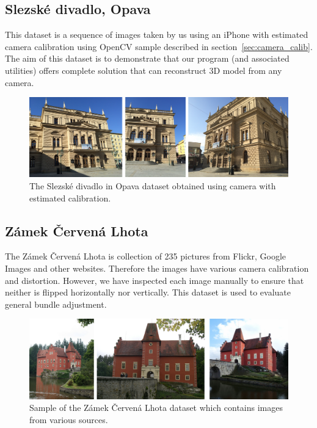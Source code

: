 \subsection*{Slezské divadlo, Opava}
This dataset is a sequence of images taken by us using an iPhone with estimated camera calibration using OpenCV sample described in section~\ref{sec:camera_calib}. The aim of this dataset is to demonstrate that our program (and associated utilities) offers complete solution that can reconstruct 3D model from any camera.

\begin{figure}[ht]
	\begin{center}
		\includegraphics[keepaspectratio,width=\textwidth]{fig/experiments-divadlo.pdf}
	\end{center}
	\caption{The Slezské divadlo in Opava dataset obtained using camera with estimated calibration.}
	\label{fig:divadlo}
\end{figure}

\subsection*{Zámek Červená Lhota}
The Zámek  Červená Lhota is collection of 235 pictures from Flickr, Google Images and other websites. Therefore the images have various camera calibration and distortion. However, we have inspected each image manually to ensure that neither is flipped horizontally nor vertically. This dataset is used to evaluate general bundle adjustment.

\begin{figure}[ht]
	\begin{center}
		\includegraphics[keepaspectratio,width=\textwidth]{fig/experiments-cervena-lhota.pdf}
	\end{center}
	\caption{Sample of the Zámek Červená Lhota dataset which contains images from various sources.}
	\label{fig:cervena-lhota}
\end{figure}

